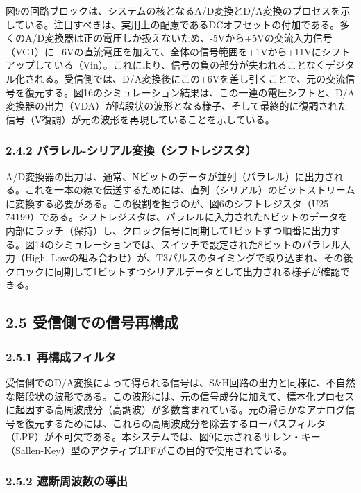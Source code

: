 \documentclass[
  a4paper,  %
  11pt,     %
]{ltjsarticle}%
\begin{document}
図9の回路ブロックは、システムの核となるA/D変換とD/A変換のプロセスを示している\cite{ref1}。注目すべきは、実用上の配慮であるDCオフセットの付加である。多くのA/D変換器は正の電圧しか扱えないため、-5Vから+5Vの交流入力信号（VG1）に+6Vの直流電圧を加えて、全体の信号範囲を+1Vから+11Vにシフトアップしている（Vin）。これにより、信号の負の部分が失われることなくデジタル化される。受信側では、D/A変換後にこの+6Vを差し引くことで、元の交流信号を復元する。図16のシミュレーション結果は、この一連の電圧シフトと、D/A変換器の出力（VDA）が階段状の波形となる様子、そして最終的に復調された信号（V復調）が元の波形を再現していることを示している\cite{ref1}。

\subsubsection{2.4.2 パラレル-シリアル変換（シフトレジスタ）}

A/D変換器の出力は、通常、Nビットのデータが並列（パラレル）に出力される。これを一本の線で伝送するためには、直列（シリアル）のビットストリームに変換する必要がある。この役割を担うのが、図6のシフトレジスタ（U25 74199）である\cite{ref1}。シフトレジスタは、パラレルに入力されたNビットのデータを内部にラッチ（保持）し、クロック信号に同期して1ビットずつ順番に出力する。図14のシミュレーションでは、スイッチで設定された8ビットのパラレル入力（High, Lowの組み合わせ）が、T3パルスのタイミングで取り込まれ、その後クロックに同期して1ビットずつシリアルデータとして出力される様子が確認できる\cite{ref1}。

\subsection{2.5 受信側での信号再構成}

\subsubsection{2.5.1 再構成フィルタ}

受信側でのD/A変換によって得られる信号は、S&H回路の出力と同様に、不自然な階段状の波形である。この波形には、元の信号成分に加えて、標本化プロセスに起因する高周波成分（高調波）が多数含まれている。元の滑らかなアナログ信号を復元するためには、これらの高周波成分を除去するローパスフィルタ（LPF）が不可欠である。本システムでは、図9に示されるサレン・キー（Sallen-Key）型のアクティブLPFがこの目的で使用されている\cite{ref1}。

\subsubsection{2.5.2 遮断周波数の導出}
\end{document}
